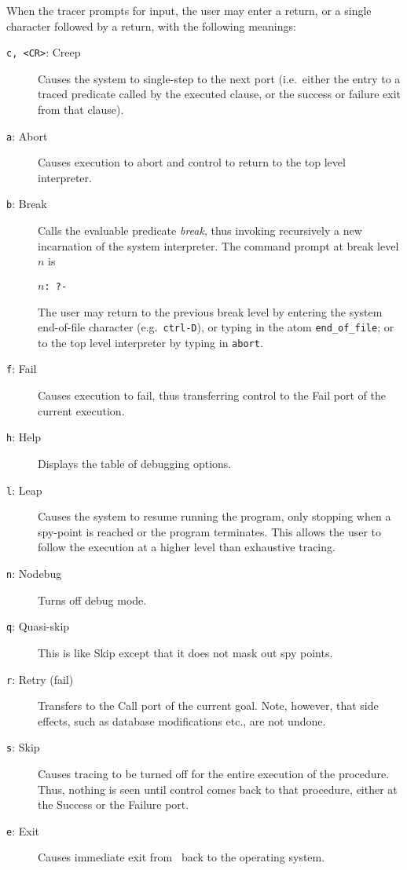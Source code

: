 When the tracer prompts for input, the user may enter a return, or a single
character followed by a return, with the following meanings:
\begin{description}
\item[{\tt c, <CR>}: Creep]
    Causes the system to single-step to the next port
    (i.e.\ either the entry to a traced predicate called by the executed clause,
    or the success or failure exit from that clause).
\item[{\tt a}: Abort]
    Causes execution to abort and control to return to the top level
    interpreter.
\item[{\tt b}: Break]
    Calls the evaluable predicate {\em break}, thus invoking recursively
    a new incarnation of the system interpreter.
    The command prompt at break level $n$ is
    \begin{center}
    {\tt $n$: \tt ?-}
    \end{center}
    The user may return to the previous break level by entering the system
    end-of-file character (e.g.\ {\tt ctrl-D}), or typing in the atom 
    {\tt end\_of\_file}; or to the top level interpreter by typing in
    {\tt abort}.
\item[{\tt f}: Fail] Causes execution to fail, thus transferring control to
    the Fail port of the current execution.
\item[{\tt h}: Help] Displays the table of debugging options.
\item[{\tt l}: Leap] Causes the system to resume running the program,
    only stopping when a spy-point is reached or the program terminates.
    This allows the user to follow the execution at a higher level than
    exhaustive tracing.
\item[{\tt n}: Nodebug] Turns off debug mode.
\item[{\tt q}: Quasi-skip] This is like Skip except that it does not mask
    out spy points.
\item[{\tt r}: Retry (fail)] Transfers to the Call port of the current goal.
    Note, however, that side effects, such as database modifications etc.,
    are not undone.
\item[{\tt s}: Skip] Causes tracing to be turned off for the entire execution
    of the procedure.  Thus, nothing is seen until control comes back to that
    procedure, either at the Success or the Failure port.
\item[{\tt e}: Exit] Causes immediate exit from \ourprolog\ back to the
    operating system.
\end{description}


